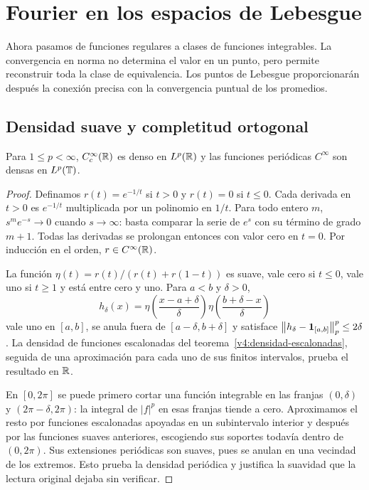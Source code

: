 \chapter{Fourier en los espacios de Lebesgue}\label{cap:v4-04}
Ahora pasamos de funciones regulares a clases de funciones integrables. La convergencia en norma no determina el valor en un punto, pero permite reconstruir toda la clase de equivalencia. Los puntos de Lebesgue proporcionarán después la conexión precisa con la convergencia puntual de los promedios.

\section{Densidad suave y completitud ortogonal}\label{lectura:v4-06}
\begin{lema}\label{v4:densidad-suave}
Para $1\leq p<\infty$, $C_c^\infty(\mathbb R)$ es denso en $L^p(\mathbb R)$ y las funciones periódicas $C^\infty$ son densas en $L^p(\mathbb T)$.
\end{lema}
\begin{proof}
Definamos $r(t)=e^{-1/t}$ si $t>0$ y $r(t)=0$ si $t\leq0$. Cada derivada en $t>0$ es $e^{-1/t}$ multiplicada por un polinomio en $1/t$. Para todo entero $m$, $s^me^{-s}\to0$ cuando $s\to\infty$: basta comparar la serie de $e^s$ con su término de grado $m+1$. Todas las derivadas se prolongan entonces con valor cero en $t=0$. Por inducción en el orden, $r\in C^\infty(\mathbb R)$.

La función $\eta(t)=r(t)/(r(t)+r(1-t))$ es suave, vale cero si $t\leq0$, vale uno si $t\geq1$ y está entre cero y uno. Para $a<b$ y $\delta>0$,
\[
 h_\delta(x)=\eta\left(\frac{x-a+\delta}{\delta}\right)
 \eta\left(\frac{b+\delta-x}{\delta}\right)
\]
vale uno en $[a,b]$, se anula fuera de $[a-\delta,b+\delta]$ y satisface
$\left\lVert h_\delta-\mathbf1_{[a,b]}\right\rVert_p^p\leq2\delta$.
La densidad de funciones escalonadas del teorema~\ref{v4:densidad-escalonadas}, seguida de una aproximación para cada uno de sus finitos intervalos, prueba el resultado en $\mathbb R$.

En $[0,2\pi]$ se puede primero cortar una función integrable en las franjas $(0,\delta)$ y $(2\pi-\delta,2\pi)$: la integral de $|f|^p$ en esas franjas tiende a cero. Aproximamos el resto por funciones escalonadas apoyadas en un subintervalo interior y después por las funciones suaves anteriores, escogiendo sus soportes todavía dentro de $(0,2\pi)$. Sus extensiones periódicas son suaves, pues se anulan en una vecindad de los extremos. Esto prueba la densidad periódica y justifica la suavidad que la lectura original dejaba sin verificar.
\end{proof}
